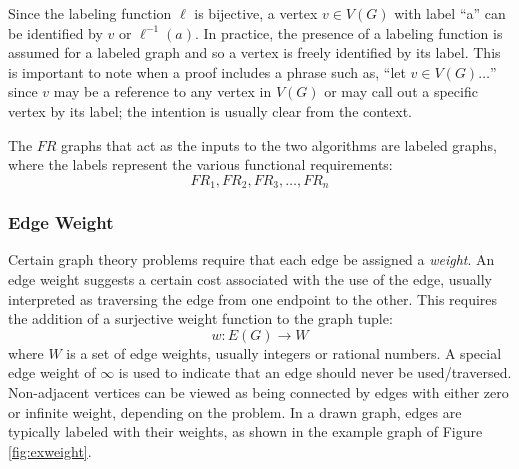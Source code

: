 Since the labeling function \(\ell\) is bijective, a vertex \(v\in V(G)\) with label ``a'' can be identified by
\(v\) or \(\ell^{-1}(a)\).  In practice, the presence of a labeling function is assumed for a labeled graph and so
a vertex is freely identified by its label.  This is important to note when a proof includes a phrase such as,
``let \(v\in V(G)\ldots\)'' since \(v\) may be a reference to any vertex in \(V(G)\) or may call out a specific
vertex by its label; the intention is usually clear from the context.

The \(FR\) graphs that act as the inputs to the two algorithms are labeled graphs, where the labels represent the
various functional requirements:
\[FR_1,FR_2,FR_3,\ldots,FR_n\]

\subsubsection{Edge Weight}

Certain graph theory problems require that each edge be assigned a \emph{weight}.  An edge weight suggests a
certain cost associated with the use of the edge, usually interpreted as traversing the edge from one endpoint to
the other.  This requires the addition of a surjective weight function to the graph tuple:
\[w:E(G)\to W\]
where \(W\) is a set of edge weights, usually integers or rational numbers.  A special edge weight of \(\infty\) is
used to indicate that an edge should never be used/traversed.  Non-adjacent vertices can be viewed as being
connected by edges with either zero or infinite weight, depending on the problem.  In a drawn graph, edges are
typically labeled with their weights, as shown in the example graph of Figure \ref{fig:exweight}.

